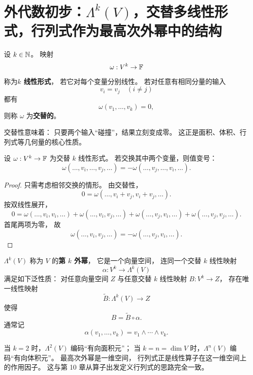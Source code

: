 \section{外代数初步：$\Lambda^k(V)$，交替多线性形式，行列式作为最高次外幂中的结构}




\begin{definition} 设 $k\in\mathbb{N}$。 映射 \[ \omega:V^k\to\mathbb{F} \] 称为\textbf{$k$ 线性形式}， 若它对每个变量分别线性。 若对任意有相同分量的输入 \[ v_i=v_j\quad (i\neq j) \] 都有 \[ \omega(v_1,\dots,v_k)=0, \] 则称 $\omega$ 为\textbf{交替的}。 \end{definition} 交替性意味着： 只要两个输入“碰撞”，结果立刻变成零。 这正是面积、体积、行列式等几何量的核心性质。




\begin{proposition} 设 $\omega:V^k\to\mathbb{F}$ 为交替 $k$ 线性形式。 若交换其中两个变量，则值变号： \[ \omega(\dots,v_i,\dots,v_j,\dots) = -\omega(\dots,v_j,\dots,v_i,\dots). \] \end{proposition}




\begin{proof} 只需考虑相邻交换的情形。 由交替性， \[ 0=\omega(\dots,v_i+v_j,v_i+v_j,\dots). \] 按双线性展开， \[ 0=\omega(\dots,v_i,v_i,\dots)+\omega(\dots,v_i,v_j,\dots) +\omega(\dots,v_j,v_i,\dots)+\omega(\dots,v_j,v_j,\dots). \] 首尾两项为零， 故 \[ \omega(\dots,v_i,v_j,\dots)=-\omega(\dots,v_j,v_i,\dots). \] \end{proof}




\begin{definition} $\Lambda^k(V)$ 称为 $V$ 的\textbf{第 $k$ 外幂}， 它是一个向量空间， 连同一个交替 $k$ 线性映射 \[ \alpha:V^k\to\Lambda^k(V) \] 满足如下泛性质： 对任意向量空间 $Z$ 与任意交替 $k$ 线性映射 $B:V^k\to Z$， 存在唯一线性映射 \[ \widetilde{B}:\Lambda^k(V)\to Z \] 使得 \[ B=\widetilde{B}\circ\alpha. \] 通常记 \[ \alpha(v_1,\dots,v_k)=v_1\wedge\cdots\wedge v_k. \] \end{definition}




\begin{remark} 当 $k=2$ 时，$\Lambda^2(V)$ 编码“有向面积元”； 当 $k=n=\dim V$ 时，$\Lambda^n(V)$ 编码“有向体积元”。 最高次外幂是一维空间， 行列式正是线性算子在这一维空间上的作用因子。 这与第 10 章从算子出发定义行列式的思路完全一致。 \end{remark}




